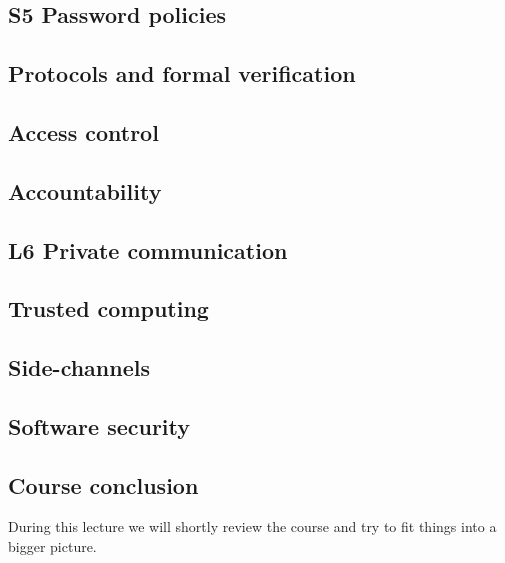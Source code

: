\subsection{S5 Password policies}


\subsection{Protocols and formal verification}


\subsection{Access control}


%

\subsection{Accountability}


\subsection{L6 Private communication}


\subsection{Trusted computing}


\subsection{Side-channels}


\subsection{Software security}


\subsection{Course conclusion}

During this lecture we will shortly review the course and try to fit things into 
a bigger picture.


